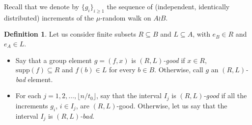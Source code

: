 \documentclass[reqno,oneside,11pt]{amsart}
\newcommand{\supp}[1]{\mathrm{supp}(#1)}
\theoremstyle{plain}
\theoremstyle{definition}
\newtheorem{defn}[thm]{Definition} %
\begin{document}
Recall that we denote by $\{g_i\}_{i\ge 1}$ the sequence of (independent, identically distributed) increments of the $\mu$-random walk on $A\wr B$.
\begin{defn}\label{def: bad elements and bad intervals}
	Let us consider finite subsets $R\subseteq B$ and $L\subseteq A$, with $e_B\in R$ and $e_A\in L$.
	\begin{itemize}
		\item Say that a group element $g=(f,x)$ is \emph{$(R,L)$-good} if $x\in R$, $\supp{f}\subseteq R$ and $f(b)\in L$ for every $b\in B$. Otherwise, call $g$ an \emph{$(R,L)$-bad} element.
		\item For each $j=1,2,\ldots,\lfloor n/t_0\rfloor$, say that the interval $I_j$ is \emph{$(R,L)$-good} if all the increments $g_i$, $i\in I_j$, are $(R,L)$-good. Otherwise, let us say that the interval $I_j$ is \emph{$(R,L)$-bad}.
	\end{itemize}
\end{defn}
\end{document}

